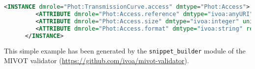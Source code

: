 \begin{lstlisting}[caption={MIVOT instanciation of the PhotDM class \texttt{Access}. 
VODML attributes are mapped as simple \texttt{ATTRIBUTE} since their cardinality is equal to 
1 and they have primitive types. In this example, automatically 
generated, \texttt{ATTRIBUTE} come with both \texttt{ref} and \texttt{value}. Using one, the other or both 
depends on the data available in the VOTable being annotated (see \ref{ATTRIBUTE}). 
The cryptic  "@@@@@" labels are due to a trick of the annoter tool. They must be replaced with the 
 \texttt{FIELD} names for attributes that are set with from field values.
},language=XML]
      <INSTANCE dmrole="Phot:TransmissionCurve.access" dmtype="Phot:Access">
         <ATTRIBUTE dmrole="Phot:Access.reference" dmtype="ivoa:anyURI" ref="@@@@@" value=""/>
         <ATTRIBUTE dmrole="Phot:Access.size" dmtype="ivoa:integer" unit="" ref="@@@@@" value=""/>
         <ATTRIBUTE dmrole="Phot:Access.format" dmtype="ivoa:string" ref="@@@@@" value=""/>
      </INSTANCE>
\end{lstlisting}  

This simple example has been generated by the \texttt{snippet_builder} module of the MIVOT validator 
(\url{https://github.com/ivoa/mivot-validator}).


